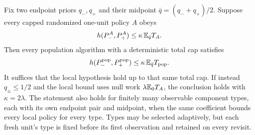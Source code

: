 \begin{lemma}\label{lem:tf-midpoint}
Fix two endpoint priors $q_-,q_+$ and their midpoint
$\bar q=(q_-+q_+)/2$. Suppose every capped randomized one-unit policy
$A$ obeys
\[
 h(P_-^A,P_+^A)\le\kappa\,\mathbb E_{\bar q}T_A.
\]
Then every population algorithm with a deterministic total cap satisfies
\[
 h(P_-^{\rm pop},P_+^{\rm pop})
 \le\kappa\,\mathbb E_{\bar q}T_{\rm pop}.
\]
It suffices that the local hypothesis hold up to that same total cap.
If instead $q_\pm\le1/2$ and the local bound uses null work
$\lambda\mathbb E_0T_A$, the conclusion holds with $\kappa=2\lambda$.
The statement also holds for finitely many observable component types,
each with its own endpoint pair and midpoint, when the same coefficient
bounds every local policy for every type. Types may be selected adaptively, but each fresh unit's type is fixed
before its first observation and retained on every revisit.
\end{lemma}

